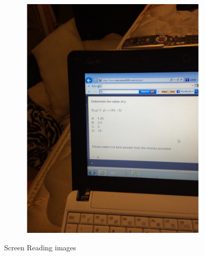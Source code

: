 \documentclass[sigconf]{acmart}
\begin{document}
\begin{figure}[hbp]
        ~ 
        \begin{subfigure}[b]{0.45\columnwidth}
                \includegraphics[width=\textwidth]{images/screen_2.pdf}  
        \end{subfigure}%
       
        \caption{Screen Reading images} 
        \label{fig:screen}
\end{figure}
\end{document}
